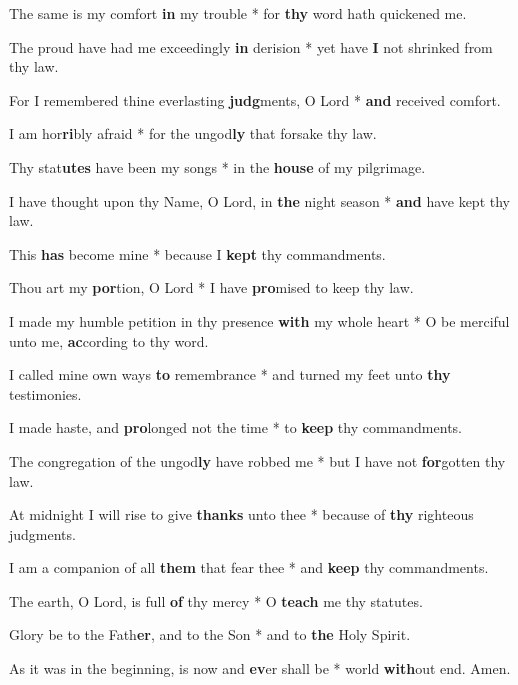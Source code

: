 \begin{multicols}{2}
	The same is my comfort \textbf{in} my trouble * for \textbf{thy} word hath quickened me.
	
	The proud have had me exceedingly \textbf{in} derision * yet have \textbf{I} not shrinked from thy law.
	
	For I remembered thine everlasting \textbf{judg}ments, O Lord * \textbf{and} received comfort.
	
	I am hor\textbf{ri}bly afraid * for the ungod\textbf{ly} that forsake thy law.
	
	Thy stat\textbf{utes} have been my songs * in the \textbf{house} of my pilgrimage.
	
	I have thought upon thy Name, O Lord, in \textbf{the} night season * \textbf{and} have kept thy law.
	
	This \textbf{has} become mine * because I \textbf{kept} thy commandments.
	
	Thou art my \textbf{por}tion, O Lord * I have \textbf{pro}mised to keep thy law.
	
	I made my humble petition in thy presence \textbf{with} my whole heart * O be merciful unto me, \textbf{ac}cording to thy word.
	
	I called mine own ways \textbf{to} remembrance * and turned my feet unto \textbf{thy} testimonies.
	
	I made haste, and \textbf{pro}longed not the time * to \textbf{keep} thy commandments.
	
	The congregation of the ungod\textbf{ly} have robbed me * but I have not \textbf{for}gotten thy law.
	
	At midnight I will rise to give \textbf{thanks} unto thee * because of \textbf{thy} righteous judgments.
	
	I am a companion of all \textbf{them} that fear thee * and \textbf{keep} thy commandments.
	
	The earth, O Lord, is full \textbf{of} thy mercy * O \textbf{teach} me thy statutes.
	
	Glory be to the Fath\textbf{er}, and to the Son * and to \textbf{the} Holy Spirit.
	
	As it was in the beginning, is now and \textbf{ev}er shall be * world \textbf{with}out end. Amen.
\end{multicols}
